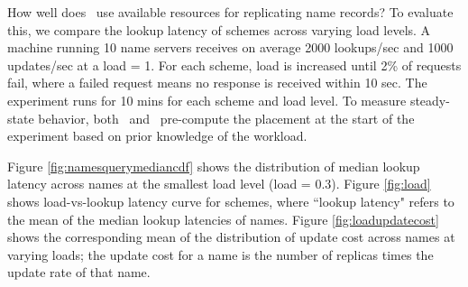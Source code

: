 


How well does \auspice\ use available resources for replicating name records? To evaluate this, we compare the lookup latency of schemes across varying load levels. A machine running 10 name servers receives on average 2000 lookups/sec and 1000 updates/sec at a load = 1. For each scheme, load is increased  until  2\% of requests fail, where a failed request means no response is received within 10 sec. The experiment runs for 10 mins for each scheme and load level. To measure steady-state behavior, both \auspice\ and \codons\ pre-compute the placement at the start of the experiment based on prior knowledge of the workload.%

Figure \ref{fig:namesquerymediancdf} shows the distribution of median lookup latency across names at the smallest load level (load = 0.3).  Figure \ref{fig:load} shows load-vs-lookup latency curve for schemes, where ``lookup latency" refers to the mean of the median lookup latencies of names. Figure \ref{fig:loadupdatecost} shows the corresponding mean of the distribution of update cost across names at varying loads; the update cost for a name is the number of replicas times the update rate of that name.


